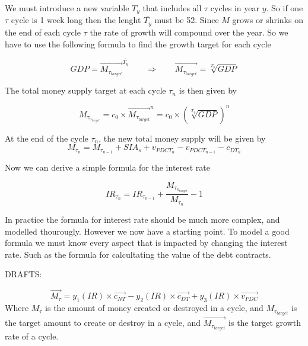 We must introduce a new variable $T_{y}$ that includes all $\tau$ cycles in year $y$. So if one $\tau$ cycle is 1 week long then the lenght $\overline{T_{y}}$ must be 52. Since $M$ grows or shrinks on the end of each cycle $\tau$ the rate of growth will compound over the year. So we have to use the following formula to find the growth target for each cycle

\begin{equation}
    GDP = \overrightarrow{M_{\tau_{target}}}^{\overline{T_{y}}} \qquad \Rightarrow \qquad \overrightarrow{M_{\tau_{target}}} = \sqrt[\overline{T_{y}}]{GDP}
\end{equation}

The total money supply target at each cycle $\tau_{n}$ is then given by

\begin{equation}
    M_{\tau_{n_{target}}} = c_{0} \times \overrightarrow{M_{\tau_{target}}}^{n} = c_{0} \times (\sqrt[\overline{T_{y}}]{GDP})^n 
\end{equation}

At the end of the cycle $\tau_{n}$, the new total money supply will be given by
\begin{equation}
    M_{\tau_{n}} = M_{\tau_{n-1}} + SIA_{s} + v_{PDCT_{n}} - v_{PDCT_{n-1}} - c_{DT_{n}}
\end{equation}

Now we can derive a simple formula for the interest rate

\begin{equation}
    IR_{\tau_{n}} = IR_{\tau_{n-1}} + \frac{M_{\tau_{n_{target}}}}{M_{\tau_{n}}} - 1
\end{equation}

In practice the formula for interest rate should be much more complex, and modelled thourougly. However we now have a starting point. To model a good formula we must know every aspect that is impacted by changing the interest rate. Such as the formula for calcultating the value of the debt contracts.














\pagebreak
DRAFTS:

\begin{equation}
    \overrightarrow{M_{\tau}} = y_{1}(IR) \times \overrightarrow{c_{NT}} - y_{2}(IR) \times \overrightarrow{c_{DT}} + y_{3}(IR) \times \overrightarrow{v_{PDC}}
\end{equation}
Where $M_{\tau}$ is the amount of money created or destroyed in a cycle, and $M_{\tau_{target}}$ is the target amount to create or destroy in a cycle, and $ \overrightarrow{M_{\tau_{target}}}$ is the target growth rate of a cycle. 



